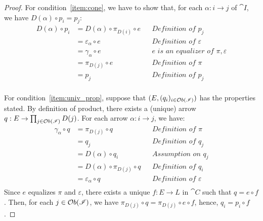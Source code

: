 \begin{proof}
    For condition~\ref{item:cone}, we have to show that, for each $\alpha : i \rightarrow j$ of $\cat I$, we have $D(\alpha) \circ p_i = p_j$:
    \begin{align*}
        D(\alpha) \circ p_i 
            &= D(\alpha) \circ \pi_{D(i)} \circ e   && \textit{Definition of $p_j$} \\
            &= \varepsilon_{\alpha} \circ e         && \textit{Definition of $\varepsilon$}\\
            &= \gamma_\alpha \circ e                && \textit{$e$ is an equalizer of $\pi, \varepsilon$}\\
            &= \pi_{D(j)} \circ e                   && \textit{Definition of $\pi$} \\
            &= p_j                                  && \textit{Definition of $p_j$} \\
    \end{align*}

    For condition~\ref{item:univ_prop}, suppose that $(E, (q_i)_{i \in \mathcal{O}b(\mathscr{I})})$ has the properties stated. By definition of product, there exists a (unique) arrow $q: E \rightarrow \prod_{j \in \mathcal{O}b(\mathscr{I})}D(j)$. For each arrow $\alpha: i \rightarrow j$, we have:
    \begin{align*}
            \gamma_\alpha \circ q 
                &= \pi_{D(j)} \circ q           && \textit{Definition of $\pi$} \\
                &= q_j                          && \textit{Definition of $q_j$} \\
                &= D(\alpha) \circ q_i          && \textit{Assumption on $q_j$} \\
                &= D(\alpha) \circ \pi_{D(j)} \circ q   &&\textit{Definition of $q_i$} \\
                &= \varepsilon_{\alpha} \circ q && \textit{Definition of $\varepsilon$} \\
    \end{align*}
    Since $e$ equalizes $\pi$ and $\varepsilon$, there exists a unique $f: E \rightarrow L$ in $\cat C$ such that $q = e \circ f$. Then, for each $j \in \mathcal{O}b(\mathscr{I})$, we have $\pi_{D(j)} \circ q = \pi_{D(j)} \circ e \circ f$, hence, $q_i = p_i \circ f$.
\end{proof}
